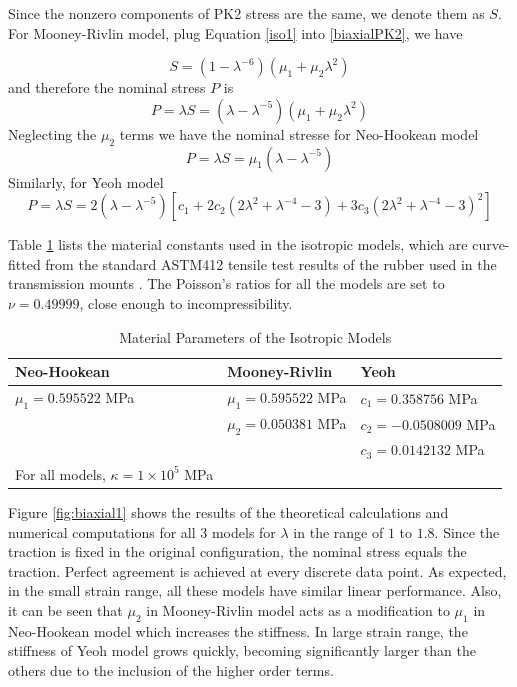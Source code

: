 Since the nonzero components of PK2 stress are the same, we denote them as $S$. For Mooney-Rivlin model, plug Equation \ref{iso1} into \ref{biaxialPK2}, we have

\begin{equation}
S = (1 - {\lambda}^{-6})(\mu_1 + \mu_2{\lambda}^2)
\end{equation}
and therefore the nominal stress $P$ is
\begin{equation}
P = \lambda S =  (\lambda - {\lambda}^{-5})(\mu_1 + \mu_2{\lambda}^2)
\end{equation}
Neglecting the $\mu_2$ terms we have the nominal stresse for Neo-Hookean model
\begin{equation}
P = \lambda S =  \mu_1(\lambda - {\lambda}^{-5})
\end{equation}
Similarly, for Yeoh model
\begin{equation}
P = \lambda S = 2(\lambda - {\lambda}^{-5})[c_1 + 2c_2(2{\lambda}^2 + {\lambda}^{-4} - 3) + 3c_3(2{\lambda}^2 + {\lambda}^{-4} - 3)^2]
\end{equation}



Table \ref{parameters} lists the material constants used in the isotropic models, which are curve-fitted from the standard ASTM412 tensile test results of the rubber used in the transmission mounts \cite{Sharma}. The Poisson's ratios for all the models are set to $\nu = 0.49999$, close enough to incompressibility.

\begin{table}[H]
\centering
\caption{Material Parameters of the Isotropic Models}
\begin{tabular} { l  l  l }
	\hline
	Neo-Hookean & Mooney-Rivlin & Yeoh \\
	\hline
	$\mu_1 = 0.595522$ MPa & $\mu_1 = 0.595522$ MPa & $c_1 = 0.358756$ MPa \\
	& $\mu_2 = 0.050381$ MPa & $c_2 = - 0.0508009$ MPa \\
	& & $c_3 = 0.0142132$ MPa \\
	\hline
	For all models, $\kappa = 1 \times 10^5 $ MPa \\
	\hline
\end{tabular}
\label{parameters}
\end{table}

Figure \ref{fig:biaxial1} shows the results of the theoretical calculations and numerical computations for all $3$ models for $\lambda$ in the range of $1$ to $1.8$. Since the traction is fixed in the original configuration, the nominal stress equals the traction. Perfect agreement is achieved at every discrete data point. As expected, in the small strain range, all these models have similar linear performance. Also, it can be seen that $\mu_2$ in Mooney-Rivlin model acts as a modification to $\mu_1$ in Neo-Hookean model which increases the stiffness. In large strain range, the stiffness of Yeoh model grows quickly, becoming significantly larger than the others due to the inclusion of the higher order terms.


